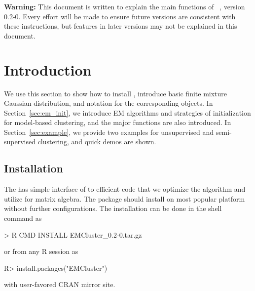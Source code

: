 
{\color{red} \bf Warning:} This document is written to explain the main
functions of ~\citep{Chen2012EMClusterpackage}, version 0.2-0.
Every effort will be made to ensure future versions are consistent with
these instructions, but features in later versions may not be explained
in this document.


\section[Introduction]{Introduction}
\label{sec:introduction}

We use this section to show how to install ,
introduce basic finite mixture Gaussian distribution,
and notation for the corresponding  objects.
In Section~\ref{sec:em_init}, we introduce EM algorithms and
strategies of initialization for model-based clustering, and
the major  functions are also introduced.
In Section~\ref{sec:example}, we provide two
examples for unsupervised and semi-supervised clustering,
and quick demos are shown.


\subsection[Installation]{Installation}
The  has simple interface of  to efficient
 code that we optimize the algorithm and utilize 
for matrix algebra. The package should install on most popular platform without
further configurations. The installation can be done in the shell command
as
\begin{Command}
> R CMD INSTALL EMCluster_0.2-0.tar.gz
\end{Command}
or from any R session as
\begin{Command}
R> install.packages("EMCluster") 
\end{Command}
with user-favored CRAN mirror site.


